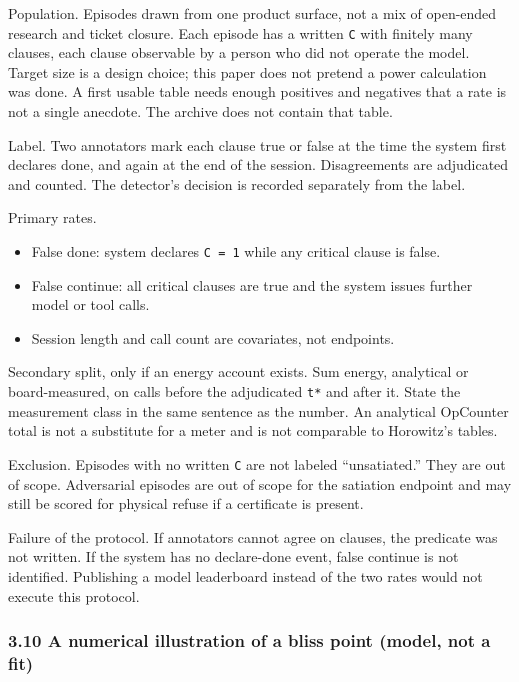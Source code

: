\documentclass[
  10pt,
]{article}
\providecommand{\tightlist}{%
  \setlength{\itemsep}{0pt}\setlength{\parskip}{0pt}}
\begin{document}
Population. Episodes drawn from one product surface, not a mix of
open-ended research and ticket closure. Each episode has a written
\texttt{C} with finitely many clauses, each clause observable by a
person who did not operate the model. Target size is a design choice;
this paper does not pretend a power calculation was done. A first usable
table needs enough positives and negatives that a rate is not a single
anecdote. The archive does not contain that table.

Label. Two annotators mark each clause true or false at the time the
system first declares done, and again at the end of the session.
Disagreements are adjudicated and counted. The detector's decision is
recorded separately from the label.

Primary rates.

\begin{itemize}
\tightlist
\item
  False done: system declares \texttt{C\ =\ 1} while any critical clause
  is false.
\item
  False continue: all critical clauses are true and the system issues
  further model or tool calls.
\item
  Session length and call count are covariates, not endpoints.
\end{itemize}

Secondary split, only if an energy account exists. Sum energy,
analytical or board-measured, on calls before the adjudicated
\texttt{t*} and after it. State the measurement class in the same
sentence as the number. An analytical OpCounter total is not a
substitute for a meter and is not comparable to Horowitz's tables.

Exclusion. Episodes with no written \texttt{C} are not labeled
``unsatiated.'' They are out of scope. Adversarial episodes are out of
scope for the satiation endpoint and may still be scored for physical
refuse if a certificate is present.

Failure of the protocol. If annotators cannot agree on clauses, the
predicate was not written. If the system has no declare-done event,
false continue is not identified. Publishing a model leaderboard instead
of the two rates would not execute this protocol.

\subsubsection{3.10 A numerical illustration of a bliss point (model,
not a
fit)}\label{a-numerical-illustration-of-a-bliss-point-model-not-a-fit}
\end{document}
